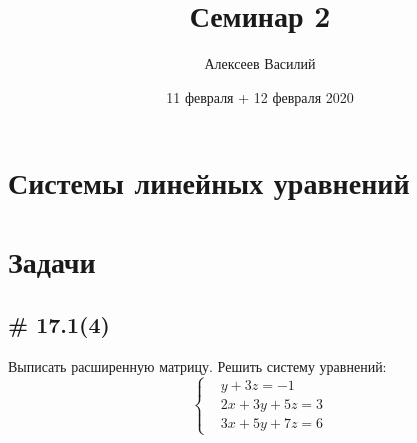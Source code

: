 \documentclass[a4paper,12pt]{article}
\author{Алексеев Василий}
\title{Семинар 2}
\date{11 февраля + 12 февраля 2020}
\begin{document}
  \maketitle
  
  \tableofcontents

  \thispagestyle{empty}
  
  \newpage
  


  \section{Системы линейных уравнений}
  
  \section{Задачи}
  
  
  \subsection{\# 17.1(4)}
  
  Выписать расширенную матрицу.
  Решить систему уравнений:
  \[
    \left\{
    \begin{aligned}
      &y + 3z = -1\\
      &2x + 3y + 5z = 3\\
      &3x + 5y + 7z = 6
    \end{aligned}
    \right.
  \]
  
\end{document}
